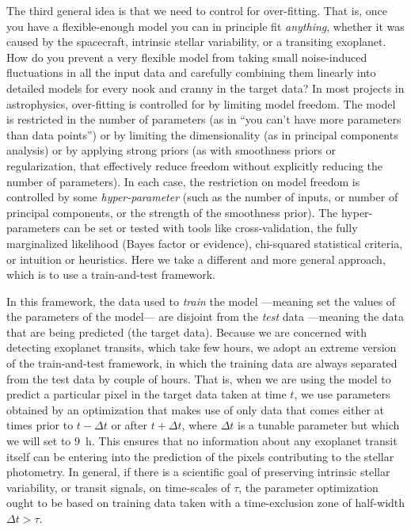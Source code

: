 \documentclass[12pt, preprint]{aastex}
\begin{document}
The third general idea is that we need to control for over-fitting.
That is, once you have a flexible-enough model you can in principle fit \emph{anything},
  whether it was caused by the spacecraft, intrinsic stellar variability, or a transiting exoplanet.
How do you prevent a very flexible model from taking small noise-induced fluctuations in all the input data
  and carefully combining them linearly into detailed models for every nook and cranny in the target data?
In most projects in astrophysics, over-fitting is controlled for by limiting model freedom.
The model is restricted in the number of parameters
  (as in ``you can't have more parameters than data points'')
  or by limiting the dimensionality
  (as in principal components analysis)
  or by applying strong priors
  (as with smoothness priors or regularization, that effectively reduce freedom without explicitly reducing the number of parameters).
In each case, the restriction on model freedom is controlled by some \emph{hyper-parameter}
  (such as the number of inputs, or number of principal components, or the strength of the smoothness prior).
The hyper-parameters can be set or tested with tools like cross-validation,
  the fully marginalized likelihood (Bayes factor or evidence),
  chi-squared statistical criteria,
  or intuition or heuristics.
Here we take a different and more general approach, which is to use a train-and-test framework.

In this framework, the data used to \emph{train} the model%
  ---meaning set the values of the parameters of the model---%
  are disjoint from the \emph{test} data
  ---meaning the data that are being predicted (the target data).
Because we are concerned with detecting exoplanet transits,
  which take few hours,
  we adopt an extreme version of the train-and-test framework,
  in which the training data are always separated from the test data by couple of hours.
That is, when we are using the model to predict a particular pixel in the target data taken at time $t$,
  we use parameters obtained by an optimization that makes use of only data
  that comes either at times prior to $t-\Delta t$ or after $t+\Delta t$,
  where $\Delta t$ is a tunable parameter but which we will set to $9$~h.
This ensures that no information about any exoplanet transit itself
  can be entering into the prediction of the pixels contributing to the stellar photometry.
In general, if there is a scientific goal of preserving intrinsic stellar variability,
  or transit signals,
  on time-scales of $\tau$,
  the parameter optimization ought to be based on training data taken with a time-exclusion zone of half-width $\Delta t > \tau$.
\end{document}
